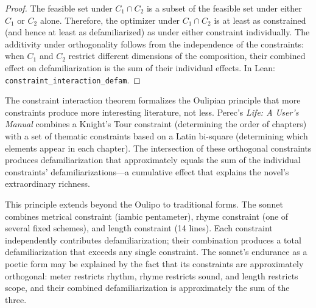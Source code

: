 \begin{proof}
The feasible set under $C_1 \cap C_2$ is a subset of the feasible set under either $C_1$ or $C_2$ alone.  Therefore, the optimizer under $C_1 \cap C_2$ is at least as constrained (and hence at least as defamiliarized) as under either constraint individually.  The additivity under orthogonality follows from the independence of the constraints: when $C_1$ and $C_2$ restrict different dimensions of the composition, their combined effect on defamiliarization is the sum of their individual effects.  In Lean: \texttt{constraint\_interaction\_defam}.
\end{proof}

\begin{interpretation}
\label{interp:oulipian-cumulation}
The constraint interaction theorem formalizes the Oulipian principle that more constraints produce more interesting literature, not less.  Perec's \textit{Life: A User's Manual} combines a Knight's Tour constraint (determining the order of chapters) with a set of thematic constraints based on a Latin bi-square (determining which elements appear in each chapter).  The intersection of these orthogonal constraints produces defamiliarization that approximately equals the sum of the individual constraints' defamiliarizations---a cumulative effect that explains the novel's extraordinary richness.

This principle extends beyond the Oulipo to traditional forms.  The sonnet combines metrical constraint (iambic pentameter), rhyme constraint (one of several fixed schemes), and length constraint (14 lines).  Each constraint independently contributes defamiliarization; their combination produces a total defamiliarization that exceeds any single constraint.  The sonnet's endurance as a poetic form may be explained by the fact that its constraints are approximately orthogonal: meter restricts rhythm, rhyme restricts sound, and length restricts scope, and their combined defamiliarization is approximately the sum of the three.
\end{interpretation}

